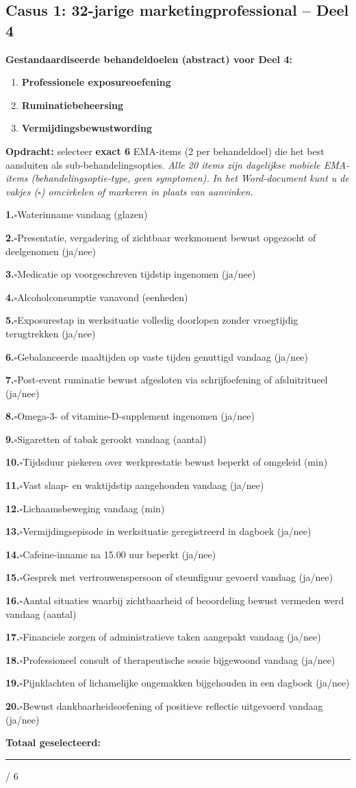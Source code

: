 \documentclass[11pt,a4paper]{article}
\newcommand{\checkitemBFS}[2]{%
\noindent\small\textbf{#1.}\hspace{0.45em}$\square$\hspace{0.4em}#2\par\vspace{0.20em}}
\begin{document}
\newpage
\subsection*{Casus 1: 32-jarige marketingprofessional -- Deel 4}

\begin{contextbox}
\small\textbf{Gestandaardiseerde behandeldoelen (abstract) voor Deel 4:}
\begin{enumerate}[topsep=2pt,itemsep=1pt,label=\arabic*.]
\item \textbf{Professionele exposureoefening}
\item \textbf{Ruminatiebeheersing}
\item \textbf{Vermijdingsbewustwording}
\end{enumerate}
\end{contextbox}

\begin{responsebox}[title={Uw antwoord -- Deel 4}]
\small\textbf{Opdracht:} selecteer \textbf{exact 6} EMA-items (2 per behandeldoel) die het best aansluiten als sub-behandelingsopties.
\textit{Alle 20 items zijn dagelijkse mobiele EMA-items (behandelingsoptie-type, geen symptomen).}
\textit{In het Word-document kunt u de vakjes ($\square$) omcirkelen of markeren in plaats van aanvinken.}

\checkitemBFS{1}{Waterinname vandaag (glazen)}
\checkitemBFS{2}{Presentatie, vergadering of zichtbaar werkmoment bewust opgezocht of deelgenomen (ja/nee)}
\checkitemBFS{3}{Medicatie op voorgeschreven tijdstip ingenomen (ja/nee)}
\checkitemBFS{4}{Alcoholconsumptie vanavond (eenheden)}
\checkitemBFS{5}{Exposurestap in werksituatie volledig doorlopen zonder vroegtijdig terugtrekken (ja/nee)}
\checkitemBFS{6}{Gebalanceerde maaltijden op vaste tijden genuttigd vandaag (ja/nee)}
\checkitemBFS{7}{Post-event ruminatie bewust afgesloten via schrijfoefening of afsluitritueel (ja/nee)}
\checkitemBFS{8}{Omega-3- of vitamine-D-supplement ingenomen (ja/nee)}
\checkitemBFS{9}{Sigaretten of tabak gerookt vandaag (aantal)}
\checkitemBFS{10}{Tijdsduur piekeren over werkprestatie bewust beperkt of omgeleid (min)}
\checkitemBFS{11}{Vast slaap- en waktijdstip aangehouden vandaag (ja/nee)}
\checkitemBFS{12}{Lichaamsbeweging vandaag (min)}
\checkitemBFS{13}{Vermijdingsepisode in werksituatie geregistreerd in dagboek (ja/nee)}
\checkitemBFS{14}{Cafeine-inname na 15.00 uur beperkt (ja/nee)}
\checkitemBFS{15}{Gesprek met vertrouwenspersoon of steunfiguur gevoerd vandaag (ja/nee)}
\checkitemBFS{16}{Aantal situaties waarbij zichtbaarheid of beoordeling bewust vermeden werd vandaag (aantal)}
\checkitemBFS{17}{Financiele zorgen of administratieve taken aangepakt vandaag (ja/nee)}
\checkitemBFS{18}{Professioneel consult of therapeutische sessie bijgewoond vandaag (ja/nee)}
\checkitemBFS{19}{Pijnklachten of lichamelijke ongemakken bijgehouden in een dagboek (ja/nee)}
\checkitemBFS{20}{Bewust dankbaarheidsoefening of positieve reflectie uitgevoerd vandaag (ja/nee)}
\vspace{0.4em}
\noindent\textbf{Totaal geselecteerd:}\hspace{0.5em}\rule{1.2cm}{0.25pt}\hspace{0.2em}/ 6
\end{responsebox}
\end{document}

